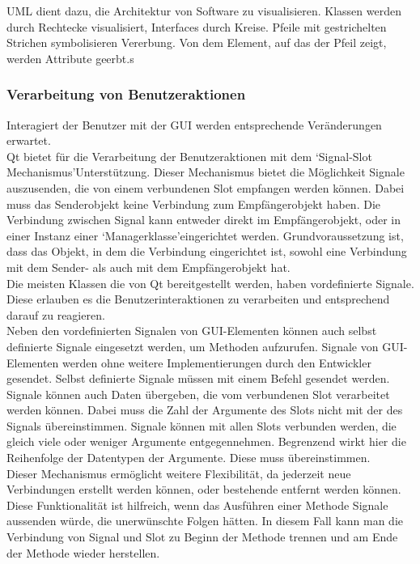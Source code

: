 \ac{UML} dient dazu, die Architektur von Software zu visualisieren. Klassen werden durch Rechtecke visualisiert, Interfaces durch Kreise. Pfeile mit gestrichelten Strichen symbolisieren Vererbung. Von dem Element, auf das der Pfeil zeigt, werden Attribute geerbt.s\subsubsection{Verarbeitung von Benutzeraktionen}
Interagiert der Benutzer mit der \ac{GUI} werden entsprechende Veränderungen erwartet. \\
Qt bietet für die Verarbeitung der Benutzeraktionen mit dem \lq Signal-Slot Mechanismus\rq\space Unterstützung. Dieser Mechanismus bietet die Möglichkeit Signale auszusenden, die von einem verbundenen Slot empfangen werden können. Dabei muss das Senderobjekt keine Verbindung zum Empfängerobjekt haben. Die Verbindung zwischen Signal kann entweder direkt im Empfängerobjekt, oder in einer Instanz einer \lq Managerklasse\rq\space eingerichtet werden. Grundvoraussetzung ist, dass das Objekt, in dem die Verbindung eingerichtet ist, sowohl eine Verbindung mit dem Sender- als auch mit dem Empfängerobjekt hat.\\
Die meisten Klassen die von Qt bereitgestellt werden, haben vordefinierte Signale. Diese erlauben es die Benutzerinteraktionen zu verarbeiten und entsprechend darauf zu reagieren. \\
Neben den vordefinierten Signalen von \ac{GUI}-Elementen können auch selbst definierte Signale eingesetzt werden, um Methoden aufzurufen. Signale von \ac{GUI}-Elementen werden ohne weitere Implementierungen durch den Entwickler gesendet. Selbst definierte Signale müssen mit einem Befehl gesendet werden. Signale können auch Daten übergeben, die vom verbundenen Slot verarbeitet werden können. Dabei muss die Zahl der Argumente des Slots nicht mit der des Signals übereinstimmen. Signale können mit allen Slots verbunden werden, die gleich viele oder weniger Argumente entgegennehmen. Begrenzend wirkt hier die Reihenfolge der Datentypen der Argumente. Diese muss übereinstimmen.\\
Dieser Mechanismus ermöglicht weitere Flexibilität, da jederzeit neue Verbindungen erstellt werden können, oder bestehende entfernt werden können. Diese Funktionalität ist hilfreich, wenn das Ausführen einer Methode Signale aussenden würde, die unerwünschte Folgen hätten. In diesem Fall kann man die Verbindung von Signal und Slot zu Beginn der Methode trennen und am Ende der Methode wieder herstellen. \\
